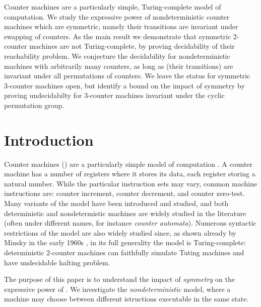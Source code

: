 
Counter machines are a particularly simple, Turing-complete
model of computation.
We study the expressive power of nondeterministic
counter machines which are symmetric, namely their
transitions are invariant under swapping of counters.
As the main result we demonstrate that symmetric 2-counter machines
are not Turing-complete, by proving decidability of their 
reachability problem.
We conjecture the decidability 
for nondeterministic machines with arbitrarily many counters,
as long as (their transitions) are invariant under all permutations
of counters. 
We leave the status for symmetric 3-counter machines open, but
identify a bound on the impact of symmetry by proving
undecidabilty for 3-counter machines invariant under the
cyclic permutation group.

\bigskip

\section{Introduction}

Counter machines () are a particularly simple
model of computation \cite{Minsky67}.
A counter machine has a number of registers where it
stores its data, each register storing a natural number.
While the particular instruction sets may vary, 
common machine instructions are: counter increment, 
counter decrement, and counter zero-test. 
Many variants of the model have been introduced and studied,
and both deterministic and nondetermistic 
machines are widely studied in the literature 
(often under different names, for instance 
\emph{counter automata}).
Numerous syntactic restrictions of the model are also widely
studied \cite{HKOW09,Ibarra78,HopcroftPansiot,FS00}
since,
as shown already by Minsky in the early 1960s \cite{Minsky61},
in its full generality the model is Turing-complete:
deterministic 2-counter machines can faithfully simulate Tuting machines
and have undecidable halting problem. 

The purpose of this paper is to understand the impact of
\emph{symmetry} on the expressive power of . %
We investigate the \emph{nondeterministic} model, where
a machine may choose between different istructions executable
in the same state.

